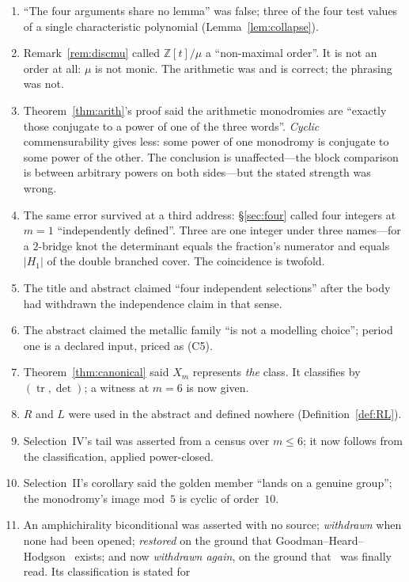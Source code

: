 \documentclass[11pt,reqno]{amsart}
\theoremstyle{plain}
\theoremstyle{definition}
\theoremstyle{remark}
\newcommand{\Z}{\mathbb{Z}}
\newcommand{\tr}{\operatorname{tr}}
\begin{document}
\begin{enumerate}[leftmargin=2.2em,itemsep=1pt]
\item ``The four arguments share no lemma'' was false; three of the four test values of a
  single characteristic polynomial (Lemma~\ref{lem:collapse}).
\item Remark~\ref{rem:discmu} called $\Z[t]/\mu$ a ``non-maximal order''. It is not an
  order at all: $\mu$ is not monic. The arithmetic was and is correct; the phrasing was not.
\item Theorem~\ref{thm:arith}'s proof said the arithmetic monodromies are ``exactly those
  conjugate to a power of one of the three words''. \emph{Cyclic} commensurability gives less:
  some power of one monodromy is conjugate to some power of the other. The conclusion is
  unaffected---the block comparison is between arbitrary powers on both sides---but the stated
  strength was wrong.
\item The same error survived at a third address: \S\ref{sec:four} called four integers at
  $m=1$ ``independently defined''. Three are one integer under three names---for a $2$-bridge
  knot the determinant equals the fraction's numerator and equals $|H_1|$ of the double
  branched cover. The coincidence is twofold.
\item The title and abstract claimed ``four independent selections'' after the body had
  withdrawn the independence claim in that sense.
\item The abstract claimed the metallic family ``is not a modelling choice''; period one
  is a declared input, priced as (C5).
\item Theorem~\ref{thm:canonical} said $X_m$ represents \emph{the} class. It classifies
  by $(\tr,\det)$; a witness at $m=6$ is now given.
\item $R$ and $L$ were used in the abstract and defined nowhere (Definition~\ref{def:RL}).
\item Selection~IV's tail was asserted from a census over $m\le6$; it now follows from
  the classification, applied power-closed.
\item Selection~II's corollary said the golden member ``lands on a genuine group''; the
  monodromy's image mod~$5$ is cyclic of order~$10$.
\item An amphichirality biconditional was asserted with no source; \emph{withdrawn}
  when none had been opened; \emph{restored} on the ground that
  Goodman--Heard--Hodgson~\cite{GHH} exists; and now \emph{withdrawn again}, on the
  ground that~\cite{GHH} was finally read. Its classification is stated for

\end{enumerate}
\end{document}
